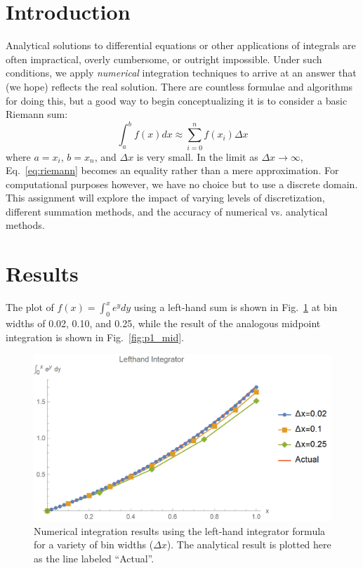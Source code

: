 \documentclass{article}
\author{\hwauthor}
\title{\hwtitle}
\date{\hwdate}
\begin{document}
\maketitle
\thispagestyle{fancy}

\section{Introduction}

Analytical solutions to differential equations or other applications of integrals are often impractical, overly cumbersome, or outright impossible. Under such conditions, we apply \emph{numerical} integration techniques to arrive at an answer that (we hope) reflects the real solution. There are countless formulae and algorithms for doing this, but a good way to begin conceptualizing it is to consider a basic Riemann sum:
\begin{equation}\label{eq:riemann}
    \int_a^b f(x) dx \approx \sum_{i=0}^n f(x_i) \Delta x
\end{equation}
where $a=x_i$, $b=x_n$, and $\Delta x$ is very small. In the limit as $\Delta x \to \infty$, Eq.~\ref{eq:riemann} becomes an equality rather than a mere approximation. For computational purposes however, we have no choice but to use a discrete domain. This assignment will explore the impact of varying levels of discretization, different summation methods, and the accuracy of numerical vs. analytical methods.

\section{Results}

\bigskip
{}
\medskip

The plot of $f(x) = \int_0^x e^y dy$ using a left-hand sum is shown in Fig.~\ref{fig:p1_left} at bin widths of 0.02, 0.10, and 0.25, while the result of the analogous midpoint integration is shown in Fig.~\ref{fig:p1_mid}.

\begin{figure}[!h]
    \centering
    \includegraphics[width=4.75in]{homework2/P1_LH.png}
    \caption{Numerical integration results using the left-hand integrator formula for a variety of bin widths ($\Delta x$). The analytical result is plotted here as the line labeled ``Actual''.}
    \label{fig:p1_left}
\end{figure}
\end{document}

